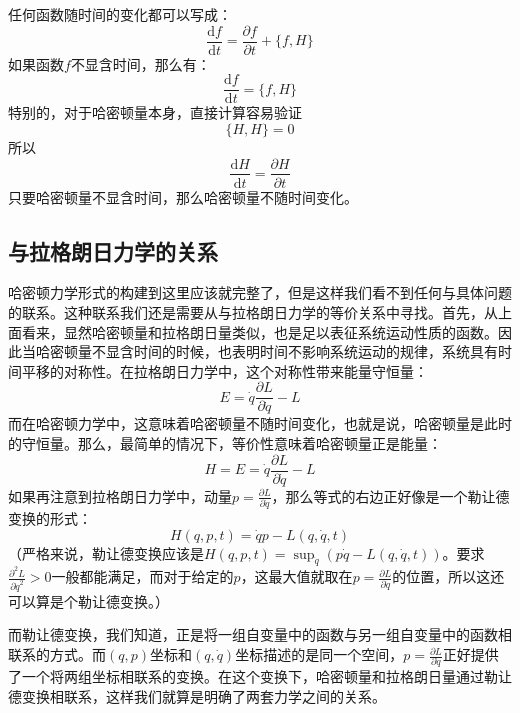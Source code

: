 \documentclass{ctexart}
\begin{document}
任何函数随时间的变化都可以写成：
\begin{equation}
\frac{\mathrm{d}f}{\mathrm{d}t}=\frac{\partial f}{\partial t}+\{ f,H\}
\end{equation}
如果函数$f$不显含时间，那么有：
\begin{equation}
\frac{\mathrm{d}f}{\mathrm{d}t}=\{ f,H\}
\end{equation}
特别的，对于哈密顿量本身，直接计算容易验证
\begin{equation}
\{H,H\}=0
\end{equation}
所以
\begin{equation}
\frac{\mathrm{d}H}{\mathrm{d}t}=\frac{\partial H}{\partial t}
\end{equation}
只要哈密顿量不显含时间，那么哈密顿量不随时间变化。

\subsection{与拉格朗日力学的关系}

哈密顿力学形式的构建到这里应该就完整了，但是这样我们看不到任何与具体问题的联系。这种联系我们还是需要从与拉格朗日力学的等价关系中寻找。首先，从上面看来，显然哈密顿量和拉格朗日量类似，也是足以表征系统运动性质的函数。因此当哈密顿量不显含时间的时候，也表明时间不影响系统运动的规律，系统具有时间平移的对称性。在拉格朗日力学中，这个对称性带来能量守恒量：
\begin{equation}
E=\dot{q}\frac{\partial L}{\partial\dot{q}}-L
\end{equation}
而在哈密顿力学中，这意味着哈密顿量不随时间变化，也就是说，哈密顿量是此时的守恒量。那么，最简单的情况下，等价性意味着哈密顿量正是能量：
\begin{equation}
H=E=\dot{q}\frac{\partial L}{\partial\dot{q}}-L
\end{equation}
如果再注意到拉格朗日力学中，动量$p=\frac{\partial L}{\partial\dot{q}}$，那么等式的右边正好像是一个勒让德变换的形式：
\begin{equation}
H(q,p,t)=\dot{q}p-L(q,\dot{q},t)
\end{equation}
（严格来说，勒让德变换应该是$H(q,p,t)=\sup_{\dot{q}}(p\dot{q}-L(q,\dot{q},t))$。要求$\frac{\partial^2 L}{\partial \dot{q}^2}>0$一般都能满足，而对于给定的$p$，这最大值就取在$p=\frac{\partial L}{\partial \dot{q}}$的位置，所以这还可以算是个勒让德变换。）

而勒让德变换，我们知道，正是将一组自变量中的函数与另一组自变量中的函数相联系的方式。而$(q,p)$坐标和$(q,\dot{q})$坐标描述的是同一个空间，$p=\frac{\partial L}{\partial \dot{q}}$正好提供了一个将两组坐标相联系的变换。在这个变换下，哈密顿量和拉格朗日量通过勒让德变换相联系，这样我们就算是明确了两套力学之间的关系。
\end{document}
